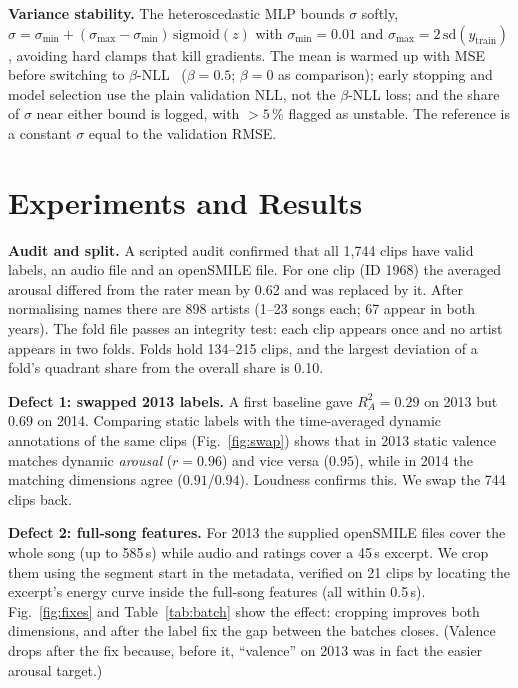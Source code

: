 \documentclass[conference]{IEEEtran}
\newcommand{\R}{R^2}
\begin{document}
\textbf{Variance stability.} The heteroscedastic MLP bounds $\sigma$ softly,
$\sigma=\sigma_{\min}+(\sigma_{\max}-\sigma_{\min})\,\mathrm{sigmoid}(z)$ with
$\sigma_{\min}=0.01$ and $\sigma_{\max}=2\,\mathrm{sd}(y_{\text{train}})$,
avoiding hard clamps that kill gradients. The mean is warmed up with MSE before
switching to $\beta$-NLL~\cite{seitzer2022} ($\beta=0.5$; $\beta=0$ as comparison); early stopping
and model selection use the plain validation NLL, not the $\beta$-NLL loss; and the share
of $\sigma$ near either bound is logged, with $>5\,\%$ flagged as unstable.
The reference is a constant $\sigma$ equal to the validation RMSE.

\section{Experiments and Results}
\label{sec:res}


\textbf{Audit and split.} A scripted audit confirmed that all 1{,}744 clips
have valid labels, an audio file and an openSMILE file. For one clip (ID 1968)
the averaged arousal differed from the rater mean by 0.62 and was replaced by
it. After normalising names there are 898 artists (1--23 songs each; 67 appear
in both years). The fold file passes an integrity test: each clip appears
once and no artist appears in two folds. Folds hold 134--215 clips, and the
largest deviation of a fold's quadrant share from the overall share is 0.10.

\textbf{Defect 1: swapped 2013 labels.} A first baseline gave $\R_A=0.29$ on
2013 but $0.69$ on 2014. Comparing static labels with the time-averaged dynamic
annotations of the same clips (Fig.~\ref{fig:swap}) shows that in 2013 static
valence matches dynamic \emph{arousal} ($r=0.96$) and vice versa ($0.95$),
while in 2014 the matching dimensions agree ($0.91$/$0.94$). Loudness confirms
this. We swap the 744 clips back.

\textbf{Defect 2: full-song features.} For 2013 the supplied openSMILE files
cover the whole song (up to 585\,s) while audio and ratings cover a 45\,s
excerpt. We crop them using the segment start in the metadata, verified on 21
clips by locating the excerpt's energy curve inside the full-song features
(all within 0.5\,s). Fig.~\ref{fig:fixes} and Table~\ref{tab:batch} show the
effect: cropping improves both dimensions, and after the label fix the gap
between the batches closes. (Valence drops after the fix because, before it,
``valence'' on 2013 was in fact the easier arousal target.)
\end{document}
